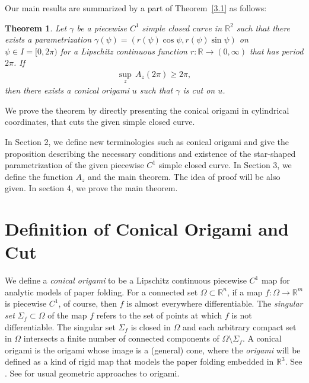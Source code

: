 \documentclass{amsart}
\theoremstyle{plain}
\newtheorem*{theorem*}{Theorem}
\theoremstyle{definition}
\theoremstyle{remark}
\begin{document}
Our main results are summarized by a part of Theorem~\ref{3.1} as follows:
\begin{theorem*} %
Let $\gamma$ be a piecewise $C^1$ simple closed curve in $\mathbb{R}^2$ such that there exists a parametrization $\gamma(\psi)=(r(\psi)\cos\psi,r(\psi)\sin\psi)$ on $\psi\in I=[0,2\pi)$ for a Lipschitz continuous function $r \colon \mathbb{R}\to(0,\infty)$ that has period $2\pi$. If
\begin{align}\label{condition}%
\sup_{z}\,A_z(2\pi)\ge2\pi,
\end{align}
then there exists a conical origami $u$ such that $\gamma$ is cut on $u$.
\end{theorem*}
\noindent We prove the theorem by directly presenting the conical origami in cylindrical coordinates, that cuts the given simple closed curve.

In Section 2, we define new terminologies such as conical origami and give the proposition describing the necessary conditions and existence of the star-shaped parametrization of the given piecewise $C^1$ simple closed curve.
In Section 3, we define the function $A_z$ and the main theorem.
The idea of proof will be also given.
In section 4, we prove the main theorem. 






\bigskip

\section{Definition of Conical Origami and Cut}%
We define a \emph{conical origami} to be a Lipschitz continuous piecewise $C^1$ map for analytic models of paper folding.
For a connected set $\Omega\subset\mathbb{R}^n$, if a map $f \colon \Omega\to\mathbb{R}^m$ is piecewise $C^1$, of course, then $f$ is almost everywhere differentiable.
The \emph{singular set} $\Sigma_f\subset\Omega$ of the map $f$ refers to the set of points  at which $f$ is not differentiable.
The singular set $\Sigma_f$ is closed in $\Omega$ and each arbitrary compact set in $\Omega$ intersects a finite number of connected components of $\Omega\setminus\Sigma_f$.
A conical origami is the origami whose image is a (general) cone, where the \emph{origami} will be defined as a kind of rigid map that models the paper folding embedded in $\mathbb{R}^3$.
See \cite{dacorogna2008lipschitz}.
See \cite{arkin2004can,hull1994mathematics,kawasaki1989relation,lang1996computational}
for usual geometric approaches to origami. 
\end{document}
